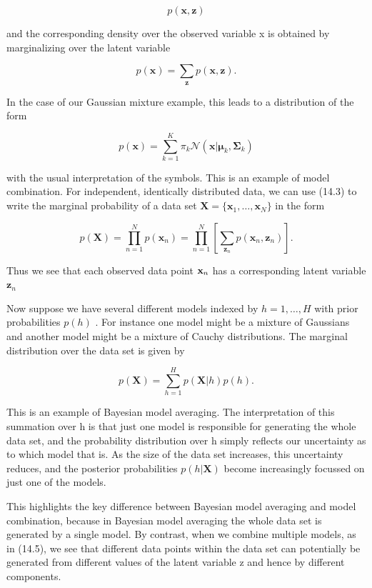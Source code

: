 \documentclass[
  10
]{article}
\begin{document}
\[
p (\mathbf {x}, \mathbf {z})\tag{14.2}
\]

and the corresponding density over the observed variable x is obtained
by marginalizing over the latent variable

\[
p (\mathbf {x}) = \sum_ {\mathbf {z}} p (\mathbf {x}, \mathbf {z}).\tag{14.3}
\]

In the case of our Gaussian mixture example, this leads to a
distribution of the form

\[
p (\mathbf {x}) = \sum_ {k = 1} ^ {K} \pi_ {k} \mathcal {N} (\mathbf {x} | \boldsymbol {\mu} _ {k}, \boldsymbol {\Sigma} _ {k})\tag{14.4}
\]

with the usual interpretation of the symbols. This is an example of
model combination. For independent, identically distributed data, we can
use (14.3) to write the marginal probability of a data set
\(\mathbf { X } = \{ \mathbf { x } _ { 1 } , \ldots , \mathbf { x } _ { N } \}\)
in the form

\[
p (\mathbf {X}) = \prod_ {n = 1} ^ {N} p (\mathbf {x} _ {n}) = \prod_ {n = 1} ^ {N} \left[ \sum_ {\mathbf {z} _ {n}} p (\mathbf {x} _ {n}, \mathbf {z} _ {n}) \right].\tag{14.5}
\]

Thus we see that each observed data point \({ \bf x } _ { n }\) has a
corresponding latent variable \(\mathbf { z } _ { n }\)

Now suppose we have several different models indexed by
\(h = 1 , \ldots , H\) with prior probabilities \(p ( h )\) . For
instance one model might be a mixture of Gaussians and another model
might be a mixture of Cauchy distributions. The marginal distribution
over the data set is given by

\[
p (\mathbf {X}) = \sum_ {h = 1} ^ {H} p (\mathbf {X} | h) p (h).\tag{14.6}
\]

This is an example of Bayesian model averaging. The interpretation of
this summation over h is that just one model is responsible for
generating the whole data set, and the probability distribution over h
simply reflects our uncertainty as to which model that is. As the size
of the data set increases, this uncertainty reduces, and the posterior
probabilities \(p ( h | \mathbf { X } )\) become increasingly focussed
on just one of the models.

This highlights the key difference between Bayesian model averaging and
model combination, because in Bayesian model averaging the whole data
set is generated by a single model. By contrast, when we combine
multiple models, as in (14.5), we see that different data points within
the data set can potentially be generated from different values of the
latent variable z and hence by different components.
\end{document}
